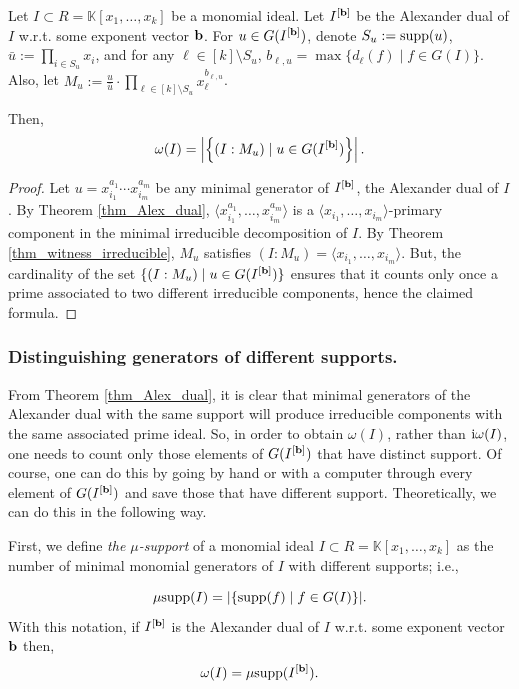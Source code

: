 \documentclass[11pt]{amsart}   %
\begin{document}
\begin{cor}\label{cor_omega_ADual} Let $I\subset R=\mathbb K[x_1,\ldots,x_k]$ be a monomial ideal. Let $I^{[{\bf b}]}$ be the Alexander dual of $I$ w.r.t. some exponent vector ${\bf b}$. For $u\in G(I^{[{\bf b}]})$, denote $S_u:={\rm supp}(u)$, $\displaystyle\bar{u}:=\prod_{i\in S_u}x_i$, and for any $\ell\in[k]\setminus S_u$, $b_{\ell,u}=\max\{d_{\ell}(f)\mid f\in G(I)\}$. Also, let $\displaystyle M_u:=\frac{u}{\bar{u}}\cdot\prod_{\ell\in[k]\setminus S_u}x_{\ell}^{b_{\ell,u}}$.

Then,
$$\omega(I)=\left|\left\{(I:M_u)\mid u\in  G(I^{[{\bf b}]})\right\}\right|.$$
\end{cor}
\begin{proof} Let $u=x_{i_1}^{a_1}\cdots x_{i_m}^{a_m}$ be any minimal generator of $I^{[{\bf b}]}$, the Alexander dual of $I$. By Theorem \ref{thm_Alex_dual}, $\langle x_{i_1}^{a_1},\ldots,x_{i_m}^{a_m}\rangle$ is a $\langle x_{i_1},\ldots,x_{i_m}\rangle$-primary component in the minimal irreducible decomposition of $I$. By Theorem \ref{thm_witness_irreducible}, $M_u$ satisfies $(I:M_u)=\langle x_{i_1},\ldots,x_{i_m}\rangle$. But, the cardinality of the set $\{(I:M_u)\mid u\in G(I^{[{\bf b}]})\}$ ensures that it counts only once a prime associated to two different irreducible components, hence the claimed formula.
\end{proof}
\subsubsection{Distinguishing generators of different supports.}\label{sec_diff_supp} From Theorem \ref{thm_Alex_dual}, it is clear that minimal generators of the Alexander dual with the same support will produce irreducible components with the same associated prime ideal. So, in order to obtain $\omega(I)$, rather than ${\rm i}\omega(I)$, one needs to count only those elements of $G(I^{[{\bf b}]})$ that have distinct support. Of course, one can do this by going by hand or with a computer through every element of $G(I^{[{\bf b}]})$ and save those that have different support. Theoretically, we can do this in the following way.

First, we define {\em the $\mu$-support} of a monomial ideal $I\subset R=\mathbb K[x_1,\ldots,x_k]$ as the number of minimal monomial generators of $I$ with different supports; i.e.,

$$\mu{\rm supp}(I)=|\{{\rm supp}(f) \mid f\in G(I)\}|.$$ With this notation, if $I^{[{\bf b}]}$ is the Alexander dual of $I$ w.r.t. some exponent vector ${\bf b}$ then,
$$\omega(I)=\mu{\rm supp}(I^{[{\bf b}]}).$$ 
\end{document}
